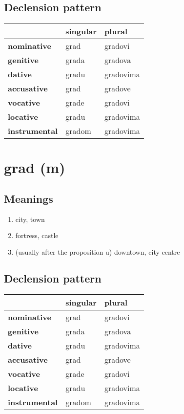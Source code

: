 \subsection*{Declension pattern}
\begin{tabularx}{\linewidth}{Xll}
\toprule
{} & singular &     plural \\
\midrule
\textbf{nominative  } &     grad &    gradovi \\
\textbf{genitive    } &    grada &    gradova \\
\textbf{dative      } &    gradu &  gradovima \\
\textbf{accusative  } &     grad &    gradove \\
\textbf{vocative    } &    grade &    gradovi \\
\textbf{locative    } &    gradu &  gradovima \\
\textbf{instrumental} &   gradom &  gradovima \\
\bottomrule
\end{tabularx}

\filbreak
\section{grad (m)}
\subsection*{Meanings}
\begin{enumerate}
\item city, town
\item fortress, castle
\item (usually after the proposition u) downtown, city centre
\end{enumerate}
\subsection*{Declension pattern}
\begin{tabularx}{\linewidth}{Xll}
\toprule
{} & singular &     plural \\
\midrule
\textbf{nominative  } &     grad &    gradovi \\
\textbf{genitive    } &    grada &    gradova \\
\textbf{dative      } &    gradu &  gradovima \\
\textbf{accusative  } &     grad &    gradove \\
\textbf{vocative    } &    grade &    gradovi \\
\textbf{locative    } &    gradu &  gradovima \\
\textbf{instrumental} &   gradom &  gradovima \\
\bottomrule
\end{tabularx}

